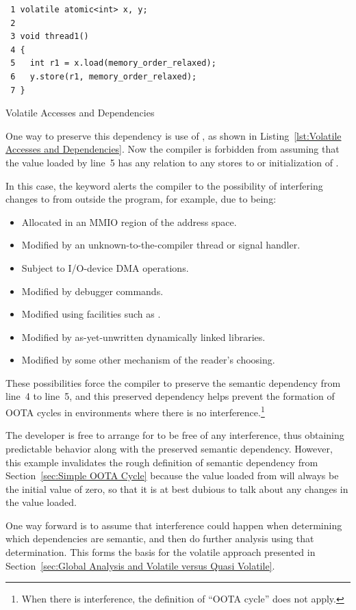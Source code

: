 \documentclass[10]{article}
\begin{document}
\begin{listing}
\begin{verbatim}
 1 volatile atomic<int> x, y;
 2
 3 void thread1()
 4 {
 5   int r1 = x.load(memory_order_relaxed);
 6   y.store(r1, memory_order_relaxed);
 7 }
\end{verbatim}
\caption{Volatile Accesses and Dependencies}
\label{lst:Volatile Accesses and Dependencies}
\end{listing}

One way to preserve this dependency is use of , as shown in
Listing~\ref{lst:Volatile Accesses and Dependencies}.
Now the compiler is forbidden from assuming that the value loaded
by line~5 has any relation to any stores to or initialization of .

In this case, the  keyword alerts the compiler to
the possibility of interfering changes to  from outside the
program, for example, due to  being:
\begin{itemize}
\item	Allocated in an MMIO region of the address space.
\item	Modified by an unknown-to-the-compiler thread
	or signal handler.
\item	Subject to I/O-device DMA operations.
\item	Modified by debugger commands.
\item	Modified using facilities such as .
\item	Modified by as-yet-unwritten dynamically linked libraries.
\item	Modified by some other mechanism of the reader's choosing.
\end{itemize}
These possibilities force the compiler to preserve the semantic
dependency from line~4 to line~5,
and this preserved dependency helps prevent the formation of OOTA cycles
in environments where there is no interference.\footnote{
	When there is interference, the definition of ``OOTA cycle''
	does not apply.}

The developer is free to arrange for  to be free of any
interference, thus obtaining predictable behavior along with the
preserved semantic dependency.
However, this example invalidates the rough definition of semantic
dependency from
Section~\ref{sec:Simple OOTA Cycle}
because the value loaded from  will always be the initial value
of zero, so that it is at best dubious to talk about any changes in
the value loaded.

One way forward is to assume that interference could happen when
determining which dependencies are semantic, and then do further analysis
using that determination.
This forms the basis for the volatile approach presented in
Section~\ref{sec:Global Analysis and Volatile versus Quasi Volatile}.
\end{document}
